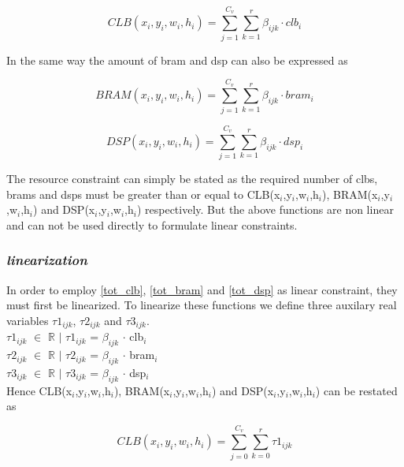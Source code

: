 \documentclass[conference]{IEEEtran}
\begin{document}
\begin{equation}
CLB(x_i,y_i,w_i,h_i) = \sum_{j=1}^{C_v} \sum_{k=1}^{r} \beta_{ijk} \cdot clb_i 
\label{tot_clb}
\end{equation}

In the same way the amount of bram and dsp can also be expressed as 

\begin{equation}
BRAM(x_i,y_i,w_i,h_i) = \sum_{j=1}^{C_v} \sum_{k=1}^{r} \beta_{ijk} \cdot bram_i 
\label{tot_bram}
\end{equation}


\begin{equation}
DSP(x_i,y_i,w_i,h_i) = \sum_{j=1}^{C_v} \sum_{k=1}^{r} \beta_{ijk} \cdot dsp_i 
\label{tot_dsp}
\end{equation}

The resource constraint can simply be stated as the required number of clbs, brams and dsps must be greater than or equal to CLB(x$_i$,y$_i$,w$_i$,h$_i$), BRAM(x$_i$,y$_i$,w$_i$,h$_i$) and DSP(x$_i$,y$_i$,w$_i$,h$_i$) respectively. But the above functions are non linear and can not be used directly to formulate linear constraints.\\

\subsubsection*{\textit {linearization}}
In order to employ \ref{tot_clb}, \ref{tot_bram} and \ref{tot_dsp} as linear constraint, they must first be linearized. To linearize these functions we define three auxilary real variables $\tau1_{ijk}$, $\tau2_{ijk}$ and $\tau3_{ijk}$. \\

$\tau1_{ijk}$ $\in$ $\mathbb{R}$ $\mid$ $\tau1_{ijk}$ = $\beta_{ijk}$ $\cdot$ clb$_i$ \\

$\tau2_{ijk}$ $\in$ $\mathbb{R}$ $\mid$ $\tau2_{ijk}$ = $\beta_{ijk}$ $\cdot$ bram$_i$ \\

$\tau3_{ijk}$ $\in$ $\mathbb{R}$ $\mid$ $\tau3_{ijk}$ = $\beta_{ijk}$ $\cdot$ dsp$_i$ \\

Hence CLB(x$_i$,y$_i$,w$_i$,h$_i$), BRAM(x$_i$,y$_i$,w$_i$,h$_i$) and DSP(x$_i$,y$_i$,w$_i$,h$_i$) can be restated as 

\begin{equation}
CLB(x_i,y_i,w_i,h_i) = \sum_{j=0}^{C_v} \sum_{k=0}^{r} \tau1_{ijk}
\end{equation}
\end{document}
